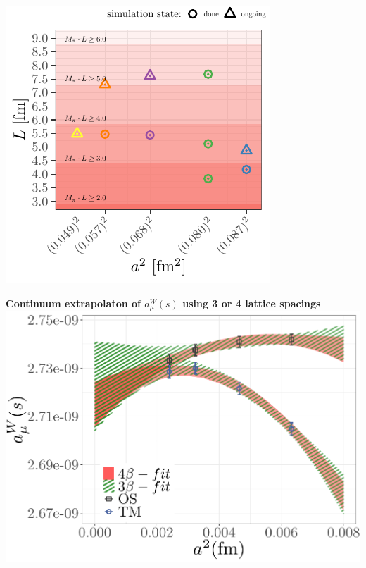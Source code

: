 \documentclass[a0,portrait]{a0poster}
\begin{document}
\begin{multicols}{2}
    \begin{minipage}{0.42\linewidth}
      \begin{center}
        \includegraphics[width=\linewidth]{ensembles_phys_point}
      \end{center}
    \end{minipage}
    \hspace{0.04\linewidth}
    \begin{minipage}{0.52\linewidth}
      \begin{center}
        \textbf{Continuum extrapolaton of $a_\mu^W(s)$ using 3 or 4 lattice spacings}
        \includegraphics[width=\linewidth]{amu_s_W_a4}
      \end{center}
    \end{minipage}


\end{multicols}
\end{document}
